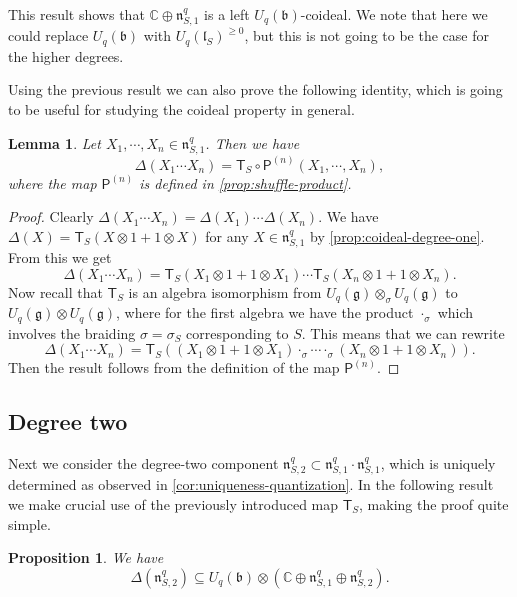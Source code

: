 \documentclass[a4paper, 12pt, reqno, english]{amsart}
\numberwithin{equation}{section}
\numberwithin{figure}{section}
\theoremstyle{plain}
\theoremstyle{plain}
\theoremstyle{plain}
\newtheorem{proposition}[theorem]{Proposition}
\theoremstyle{plain}
\newtheorem{lemma}[theorem]{Lemma}
\theoremstyle{plain}
\theoremstyle{definition}
\theoremstyle{definition}
\theoremstyle{definition}
\theoremstyle{remark}
\theoremstyle{definition}
\theoremstyle{definition}
\newcommand{\Uqb}{U_q(\mathfrak{b})}
\newcommand{\Uqg}{U_q(\mathfrak{g})}
\newcommand{\UqlS}{U_q(\mathfrak{l}_S)}
\newcommand{\bbC}{\mathbb{C}}
\newcommand{\lien}{\mathfrak{n}}
\newcommand{\tmapS}{\mathsf{T}_S}
\newcommand{\pmap}{\mathsf{P}}
\newcommand{\qnil}{\lien^q}
\begin{document}
This result shows that $\bbC \oplus \qnil_{S, 1}$ is a left $\Uqb$-coideal.
We note that here we could replace $\Uqb$ with $\UqlS^{\geq 0}$, but this is not going to be the case for the higher degrees.

Using the previous result we can also prove the following identity, which is going to be useful for studying the coideal property in general.

\begin{lemma}
\label{lem:delta-shuffle}
Let $X_1, \cdots, X_n \in \qnil_{S, 1}$. Then we have
\[
\Delta(X_1 \cdots X_n) = \tmapS \circ \pmap^{(n)} (X_1, \cdots, X_n),
\]
where the map $\pmap^{(n)}$ is defined in \cref{prop:shuffle-product}.
\end{lemma}

\begin{proof}
Clearly $\Delta(X_1 \cdots X_n) = \Delta(X_1) \cdots \Delta(X_n)$.
We have $\Delta(X) = \tmapS(X \otimes 1 + 1 \otimes X)$ for any $X \in \qnil_{S, 1}$ by \cref{prop:coideal-degree-one}.
From this we get
\[
\Delta(X_1 \cdots X_n) = \tmapS(X_1 \otimes 1 + 1 \otimes X_1) \cdots \tmapS(X_n \otimes 1 + 1 \otimes X_n).
\]
Now recall that $\tmapS$ is an algebra isomorphism from $\Uqg \otimes_\sigma \Uqg$ to $\Uqg \otimes \Uqg$, where for the first algebra we have the product $\cdot_\sigma$ which involves the braiding $\sigma = \sigma_S$ corresponding to $S$.
This means that we can rewrite
\[
\Delta(X_1 \cdots X_n) = \tmapS \left( (X_1 \otimes 1 + 1 \otimes X_1) \cdot_\sigma \cdots \cdot_\sigma (X_n \otimes 1 + 1 \otimes X_n) \right).
\]
Then the result follows from the definition of the map $\pmap^{(n)}$.
\end{proof}

\subsection{Degree two}

Next we consider the degree-two component $\lien^q_{S, 2} \subset \lien^q_{S, 1} \cdot \lien^q_{S, 1}$, which is uniquely determined as observed in \cref{cor:uniqueness-quantization}.
In the following result we make crucial use of the previously introduced map $\tmapS$, making the proof quite simple.

\begin{proposition}
\label{prop:coideal-degree-two}
We have
\[
\Delta(\lien^q_{S, 2}) \subseteq \Uqb \otimes (\bbC \oplus \qnil_{S, 1} \oplus \qnil_{S, 2}).
\]
\end{proposition}
\end{document}

